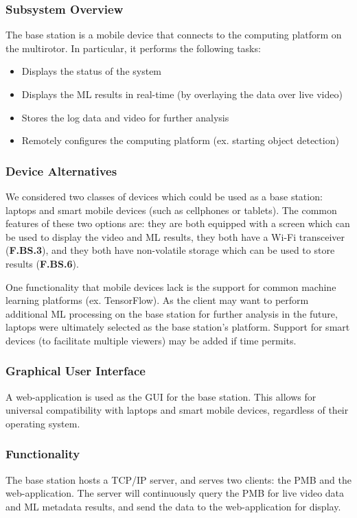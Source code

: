 \subsubsection{Subsystem Overview}

The base station is a mobile device that connects to the computing platform on the multirotor. In particular, it performs the following tasks:
\begin{itemize}
    \item Displays the status of the system
    \item Displays the ML results in real-time (by overlaying the data over live video)
    \item Stores the log data and video for further analysis
    \item Remotely configures the computing platform (ex. starting object detection)
\end{itemize}

\subsubsection{Device Alternatives}
We considered two classes of devices which could be used as a base station: laptops and smart mobile devices (such as cellphones or tablets). The common features of these two options are: they are both equipped with a screen which can be used to display the video and ML results, they both have a Wi-Fi transceiver (\textbf{F.BS.3}), and they both have non-volatile storage which can be used to store results (\textbf{F.BS.6}).

One functionality that mobile devices lack is the support for common machine learning platforms (ex. TensorFlow). As the client may want to perform additional ML processing on the base station for further analysis in the future, laptops were ultimately selected as the base station's platform. Support for smart devices (to facilitate multiple viewers) may be added if time permits.

\subsubsection {Graphical User Interface}
A web-application is used as the GUI for the base station. This allows for universal compatibility with laptops and smart mobile devices, regardless of their operating system.

\subsubsection{Functionality}
The base station hosts a TCP/IP server, and serves two clients: the PMB and the web-application. The server will continuously query the PMB for live video data and ML metadata results, and send the data to the web-application for display.

